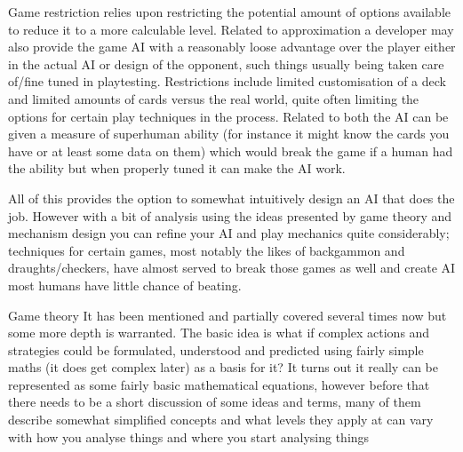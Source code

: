 \documentclass[
]{book}
\begin{document}
Game restriction relies upon restricting the potential amount of options available to reduce it to a more calculable level. Related to approximation a developer may also provide the game AI with a reasonably loose advantage over the player either in the actual AI or design of the opponent, such things usually being taken care of/fine tuned in playtesting. Restrictions include limited customisation of a deck and limited amounts of cards versus the real world, quite often limiting the options for certain play techniques in the process. Related to both the AI can be given a measure of superhuman ability (for instance it might know the cards you have or at least some data on them) which would break the game if a human had the ability but when properly tuned it can make the AI work.

All of this provides the option to somewhat intuitively design an AI that does the job. However with a bit of analysis using the ideas presented by game theory and mechanism design you can refine your AI and play mechanics quite considerably; techniques for certain games, most notably the likes of backgammon and draughts/checkers, have almost served to break those games as well and create AI most humans have little chance of beating.

Game theory It has been mentioned and partially covered several times now but some more depth is warranted. The basic idea is what if complex actions and strategies could be formulated, understood and predicted using fairly simple maths (it does get complex later) as a basis for it? It turns out it really can be represented as some fairly basic mathematical equations, however before that there needs to be a short discussion of some ideas and terms, many of them describe somewhat simplified concepts and what levels they apply at can vary with how you analyse things and where you start analysing things
\end{document}
